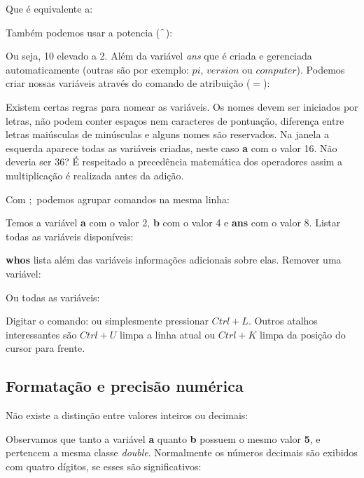 \documentclass[a4paper,11pt]{article}
\begin{document}
Que é equivalente a: \\

Também podemos usar a potencia ($\string^$): \\

Ou seja, 10 elevado a 2. Além da variável \textit{ans} que é criada e gerenciada automaticamente (outras são por exemplo: $pi$, $version$ ou $computer$). Podemos criar nossas variáveis através do comando de atribuição ($=$): \\

Existem certas regras para nomear as variáveis. Os nomes devem ser iniciados por letras, não podem conter espaços nem caracteres de pontuação, diferença entre letras maiúsculas de minúsculas e alguns nomes são reservados. Na janela a esquerda aparece todas as variáveis criadas, neste caso \textbf{a} com o valor 16. Não deveria ser 36? É respeitado a precedência matemática dos operadores assim a multiplicação é realizada antes da adição. 

Com $;$ podemos agrupar comandos na mesma linha: \\

Temos a variável \textbf{a} com o valor 2, \textbf{b} com o valor 4 e \textbf{ans} com o valor 8. Listar todas as variáveis disponíveis: \\

\textbf{whos} lista além das variáveis informações adicionais sobre elas. Remover uma variável: \\

Ou todas as variáveis: \\

\begin{theo}{}
	Digitar o comando:  ou simplesmente pressionar $Ctrl+L$. Outros atalhos interessantes são $Ctrl+U$ limpa a linha atual ou $Ctrl+K$ limpa da posição do cursor para frente.
\end{theo}

\subsection{Formatação e precisão numérica}
Não existe a distinção entre valores inteiros ou decimais: \\

Observamos que tanto a variável \textbf{a} quanto \textbf{b} possuem o mesmo valor \textbf{5}, e pertencem a mesma classe \textit{double}. Normalmente os números decimais são exibidos com quatro dígitos, se esses são significativos: \\
\end{document}

